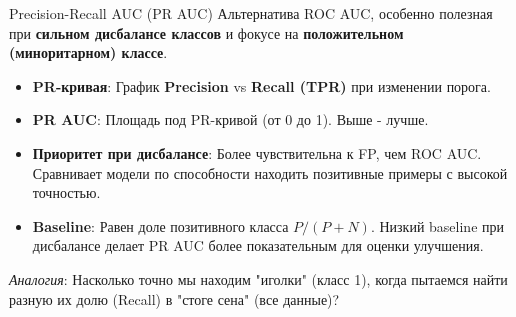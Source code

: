 \begin{myexampleblock}{{Precision-Recall AUC (PR AUC)}}
    Альтернатива ROC AUC, особенно полезная при \textbf{сильном дисбалансе классов} и фокусе на \textbf{положительном (миноритарном) классе}.

    \begin{itemize}[nosep, leftmargin=*]
        \item \textbf{PR-кривая}: График \textbf{Precision} vs \textbf{Recall (TPR)} при изменении порога.
        \item \textbf{PR AUC}: Площадь под PR-кривой (от 0 до 1). Выше - лучше.
        \item \textbf{Приоритет при дисбалансе}: Более чувствительна к FP, чем ROC AUC. Сравнивает модели по способности находить позитивные примеры с высокой точностью.
        \item \textbf{Baseline}: Равен доле позитивного класса $P/(P+N)$. Низкий baseline при дисбалансе делает PR AUC более показательным для оценки улучшения.
    \end{itemize}
    \textit{Аналогия}: Насколько точно мы находим "иголки" (класс 1), когда пытаемся найти разную их долю (Recall) в "стоге сена" (все данные)?

    \begin{center}
    \end{center}
\end{myexampleblock}

